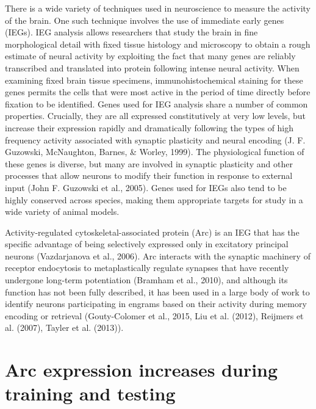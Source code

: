 \documentclass[12pt,a4paperpaper,]{report}
\begin{document}
There is a wide variety of techniques used in neuroscience to measure
the activity of the brain. One such technique involves the use of
immediate early genes (IEGs). IEG analysis allows researchers that study
the brain in fine morphological detail with fixed tissue histology and
microscopy to obtain a rough estimate of neural activity by exploiting
the fact that many genes are reliably transcribed and translated into
protein following intense neural activity. When examining fixed brain
tissue specimens, immunohistochemical staining for these genes permits
the cells that were most active in the period of time directly before
fixation to be identified. Genes used for IEG analysis share a number of
common properties. Crucially, they are all expressed constitutively at
very low levels, but increase their expression rapidly and dramatically
following the types of high frequency activity associated with synaptic
plasticity and neural encoding (J. F. Guzowski, McNaughton, Barnes, \&
Worley, 1999). The physiological function of these genes is diverse, but
many are involved in synaptic plasticity and other processes that allow
neurons to modify their function in response to external input (John F.
Guzowski et al., 2005). Genes used for IEGs also tend to be highly
conserved across species, making them appropriate targets for study in a
wide variety of animal models.

Activity-regulated cytoskeletal-associated protein (Arc) is an IEG that
has the specific advantage of being selectively expressed only in
excitatory principal neurons (Vazdarjanova et al., 2006). Arc interacts
with the synaptic machinery of receptor endocytosis to metaplastically
regulate synapses that have recently undergone long-term potentiation
(Bramham et al., 2010), and although its function has not been fully
described, it has been used in a large body of work to identify neurons
participating in engrams based on their activity during memory encoding
or retrieval (Gouty-Colomer et al., 2015, Liu et al. (2012), Reijmers et
al. (2007), Tayler et al. (2013)).

\section{Arc expression increases during training and
testing}\label{arc-expression-increases-during-training-and-testing}
\end{document}

